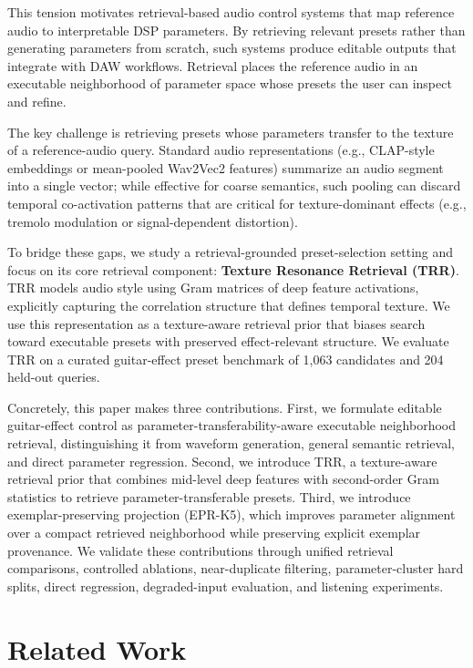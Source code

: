 This tension motivates retrieval-based audio control systems that map reference audio to interpretable DSP parameters. By retrieving relevant presets rather than generating parameters from scratch, such systems produce editable outputs that integrate with DAW workflows. Retrieval places the reference audio in an executable neighborhood of parameter space whose presets the user can inspect and refine.

The key challenge is retrieving presets whose parameters transfer to the texture of a reference-audio query. Standard audio representations (e.g., CLAP-style embeddings or mean-pooled Wav2Vec2 features) summarize an audio segment into a single vector; while effective for coarse semantics, such pooling can discard temporal co-activation patterns that are critical for texture-dominant effects (e.g., tremolo modulation or signal-dependent distortion).

To bridge these gaps, we study a retrieval-grounded preset-selection setting and focus on its core retrieval component: \textbf{Texture Resonance Retrieval (TRR)}. TRR models audio style using Gram matrices of deep feature activations, explicitly capturing the correlation structure that defines temporal texture. We use this representation as a texture-aware retrieval prior that biases search toward executable presets with preserved effect-relevant structure. We evaluate TRR on a curated guitar-effect preset benchmark of 1,063 candidates and 204 held-out queries.

Concretely, this paper makes three contributions. First, we formulate editable guitar-effect control as parameter-transferability-aware executable neighborhood retrieval, distinguishing it from waveform generation, general semantic retrieval, and direct parameter regression. Second, we introduce TRR, a texture-aware retrieval prior that combines mid-level deep features with second-order Gram statistics to retrieve parameter-transferable presets. Third, we introduce exemplar-preserving projection (EPR-K5), which improves parameter alignment over a compact retrieved neighborhood while preserving explicit exemplar provenance. We validate these contributions through unified retrieval comparisons, controlled ablations, near-duplicate filtering, parameter-cluster hard splits, direct regression, degraded-input evaluation, and listening experiments.

\section{Related Work}
\label{sec:related_work}

